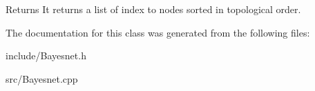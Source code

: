 \begin{DoxyReturn}{Returns}
It returns a list of index to nodes sorted in topological order. 
\end{DoxyReturn}


The documentation for this class was generated from the following files\-:\begin{DoxyCompactItemize}
\item 
include/Bayesnet.\-h\item 
src/Bayesnet.\-cpp\end{DoxyCompactItemize}
